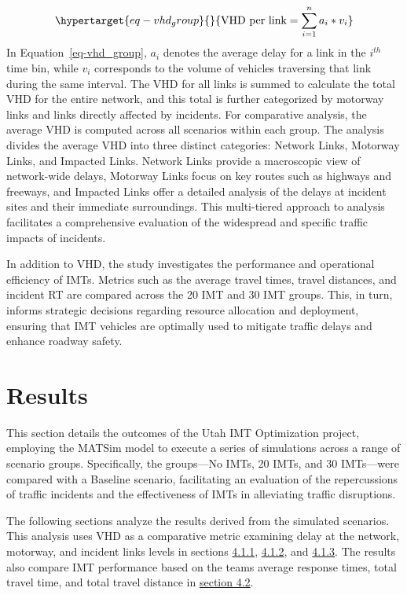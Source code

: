 \documentclass[fancy, oneside, mastersfancy, ms]{byuthesis}
\begin{document}
\begin{equation}\protect\hypertarget{eq-vhd_group}{}{
\text{VHD per link} = {\sum_{i=1}^{n} a_i}*{v_i}
}\label{eq-vhd_group}\end{equation} In Equation~\ref{eq-vhd_group},
\(a_i\) denotes the average delay for a link in the \(i^{th}\) time bin,
while \(v_i\) corresponds to the volume of vehicles traversing that link
during the same interval. The VHD for all links is summed to calculate
the total VHD for the entire network, and this total is further
categorized by motorway links and links directly affected by incidents.
For comparative analysis, the average VHD is computed across all
scenarios within each group. The analysis divides the average VHD into
three distinct categories: Network Links, Motorway Links, and Impacted
Links. Network Links provide a macroscopic view of network-wide delays,
Motorway Links focus on key routes such as highways and freeways, and
Impacted Links offer a detailed analysis of the delays at incident sites
and their immediate surroundings. This multi-tiered approach to analysis
facilitates a comprehensive evaluation of the widespread and specific
traffic impacts of incidents.

In addition to VHD, the study investigates the performance and
operational efficiency of IMTs. Metrics such as the average travel
times, travel distances, and incident RT are compared across the 20 IMT
and 30 IMT groups. This, in turn, informs strategic decisions regarding
resource allocation and deployment, ensuring that IMT vehicles are
optimally used to mitigate traffic delays and enhance roadway safety.


\hypertarget{sec-results}{%
\chapter{Results}\label{sec-results}}

This section details the outcomes of the Utah IMT Optimization project,
employing the MATSim model to execute a series of simulations across a
range of scenario groups. Specifically, the groups---No IMTs, 20 IMTs,
and 30 IMTs---were compared with a Baseline scenario, facilitating an
evaluation of the repercussions of traffic incidents and the
effectiveness of IMTs in alleviating traffic disruptions.

The following sections analyze the results derived from the simulated
scenarios. This analysis uses VHD as a comparative metric examining
delay at the network, motorway, and incident links levels in sections
\protect\hyperlink{sec-VHD-Network}{4.1.1},
\protect\hyperlink{sec-VHD-Motorway}{4.1.2}, and
\protect\hyperlink{sec-impacted}{4.1.3}. The results also compare IMT
performance based on the teams average response times, total travel
time, and total travel distance in
\protect\hyperlink{sec-IMT-performance}{section 4.2}.
\end{document}
